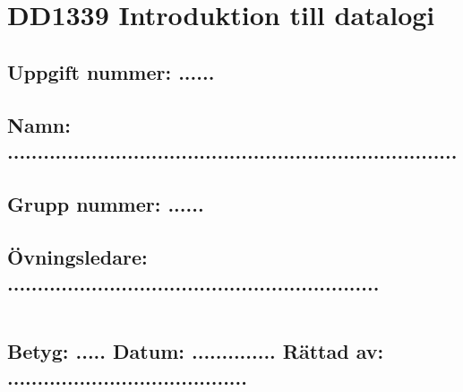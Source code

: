 %

%

\thispagestyle{empty}
\section*{DD1339 Introduktion till datalogi}

\vspace{10mm}

\subsection*{Uppgift nummer: ......}

\vspace{3mm}

\subsection*{Namn: ...........................................................................}

\vspace{3mm}

\subsection*{Grupp nummer: ......}

\vspace{3mm}

\subsection*{Övningsledare: ..............................................................}


\vspace{10mm}

\begin{tabular}{l}
 \hspace{140mm} \\
\hline \hline
\end{tabular}

\vspace{5mm}

\subsection*{Betyg: ..... \hspace{2mm}  Datum: .............. \hspace{2mm} Rättad av: ........................................}


%
